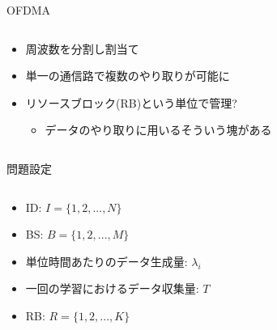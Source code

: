 \documentclass[unicode,12pt,aspectratio=169, dvipdfmx]{beamer}
\begin{document}
    \begin{frame}{OFDMA}
        \begin{columns}
            \begin{column}[T]{.7\linewidth}
                \begin{itemize}
                    \item 周波数を分割し割当て
                    \item 単一の通信路で複数のやり取りが可能に
                    \item リソースブロック(RB)という単位で管理?
                    \begin{itemize}
                        \item データのやり取りに用いるそういう塊がある
                    \end{itemize}    
                \end{itemize}          
            \end{column}
        \end{columns}
    \end{frame}

    \begin{frame}{問題設定}
        \begin{columns}
            \begin{column}[T]{.7\linewidth}
                \begin{itemize}
                    \item ID: $I = {\{1, 2, ..., N\}}$
                    \item BS: $B = {\{1, 2, ..., M\}}$
                    \item 単位時間あたりのデータ生成量: $\lambda_{i}$
                    \item 一回の学習におけるデータ収集量: $T$
                    \item RB: $R = {\{1, 2, ..., K\}}$
                \end{itemize}          
            \end{column}
        \end{columns}
    \end{frame}
\end{document}
